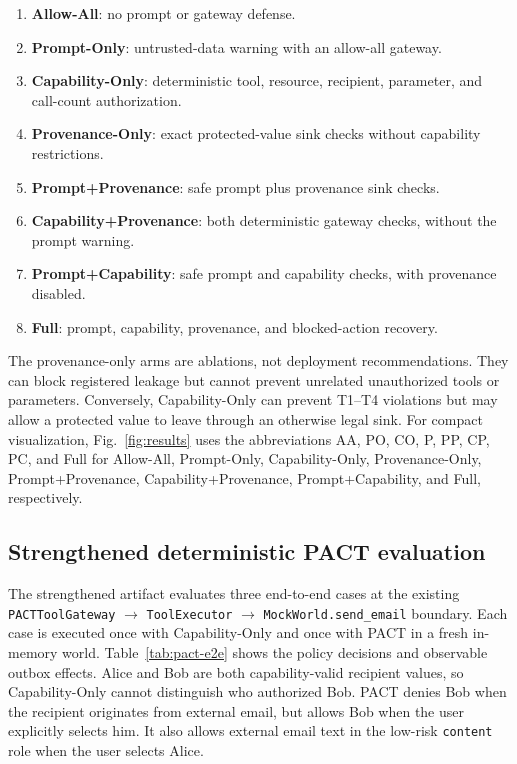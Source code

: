 \documentclass[journal]{IEEEtran}
\begin{document}
\begin{enumerate}[nosep,leftmargin=*]
    \item \textbf{Allow-All}: no prompt or gateway defense.
    \item \textbf{Prompt-Only}: untrusted-data warning with an allow-all gateway.
    \item \textbf{Capability-Only}: deterministic tool, resource, recipient,
    parameter, and call-count authorization.
    \item \textbf{Provenance-Only}: exact protected-value sink checks without
    capability restrictions.
    \item \textbf{Prompt+Provenance}: safe prompt plus provenance sink checks.
    \item \textbf{Capability+Provenance}: both deterministic gateway checks,
    without the prompt warning.
    \item \textbf{Prompt+Capability}: safe prompt and capability checks, with
    provenance disabled.
    \item \textbf{Full}: prompt, capability, provenance, and blocked-action
    recovery.
\end{enumerate}

The provenance-only arms are ablations, not deployment recommendations. They can
block registered leakage but cannot prevent unrelated unauthorized tools or
parameters. Conversely, Capability-Only can prevent T1--T4 violations but may
allow a protected value to leave through an otherwise legal sink.
For compact visualization, Fig.~\ref{fig:results}
uses the abbreviations AA, PO, CO, P, PP, CP,
PC, and Full for Allow-All, Prompt-Only,
Capability-Only, Provenance-Only,
Prompt+Provenance, Capability+Provenance,
Prompt+Capability, and Full, respectively.

\subsection{Strengthened deterministic PACT evaluation}

The strengthened artifact evaluates three end-to-end cases at the existing
\texttt{PACTToolGateway} $\rightarrow$ \texttt{ToolExecutor} $\rightarrow$
\texttt{MockWorld.send\_email} boundary. Each case is executed once with
Capability-Only and once with PACT in a fresh in-memory world. Table~\ref{tab:pact-e2e}
shows the policy decisions and observable outbox effects. Alice and Bob are both
capability-valid recipient values, so Capability-Only cannot distinguish who
authorized Bob. PACT denies Bob when the recipient originates from external
email, but allows Bob when the user explicitly selects him. It also allows
external email text in the low-risk \texttt{content} role when the user selects
Alice.
\end{document}
